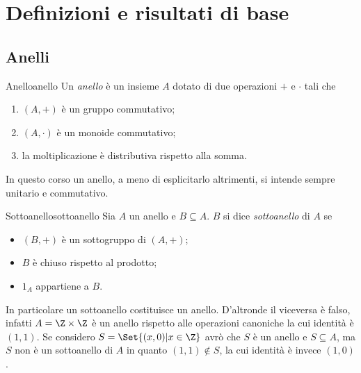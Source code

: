 \chapter{Definizioni e risultati di base}
%
%
\section{Anelli}

\begin{defn}{Anello}{anello}
	Un \emph{anello} è un insieme \(A\) dotato di due operazioni \(+\) e \(\cdot\) tali che
	\begin{enumerate}
		\item \((A,+)\) è un gruppo commutativo;
		\item \((A,\cdot)\) è un monoide commutativo;
		\item la moltiplicazione è distributiva rispetto alla somma.
	\end{enumerate}
\end{defn}

\begin{notz}
	In questo corso un anello, a meno di esplicitarlo altrimenti, si intende sempre unitario e commutativo.
\end{notz}

\begin{defn}{Sottoanello}{sottoanello}
	Sia \(A\) un anello e \(B\subseteq A\).
	\(B\) si dice \emph{sottoanello} di \(A\) se
	\begin{itemize}
		\item \((B,+)\) è un sottogruppo di \((A,+)\);
		\item \(B\) è chiuso rispetto al prodotto;
		\item \(1_A\) appartiene a \(B\).
	\end{itemize}
\end{defn}

\begin{oss}
	In particolare un sottoanello costituisce un anello.
	D'altronde il viceversa è falso, infatti \(A=\Z\times \Z\) è un anello rispetto alle operazioni canoniche la cui identità è \((1,1)\).
	Se considero \(S = \Set{(x,0)| x\in \Z}\) avrò che \(S\) è un anello e \(S\subseteq A\), ma \(S\) non è un sottoanello di \(A\) in quanto \((1,1)\not\in S\), la cui identità è invece \((1,0)\).
\end{oss}

